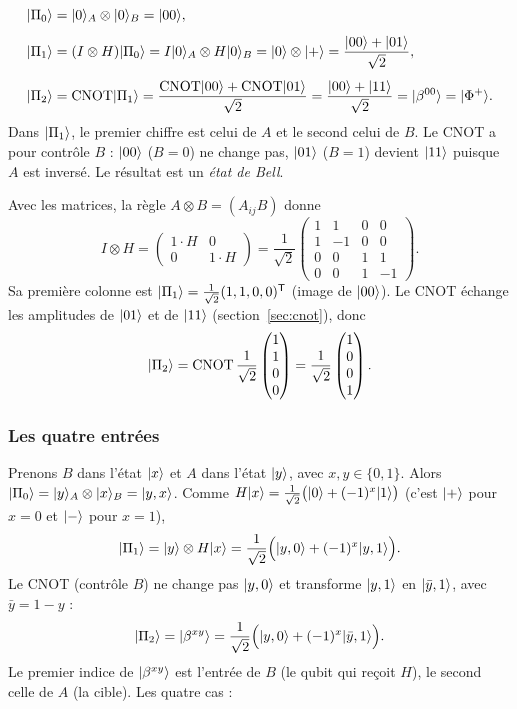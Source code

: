 \begin{align*}
  |\Pi_0\rangle&=|0\rangle_A\otimes|0\rangle_B=|00\rangle,\\[1ex]
  |\Pi_1\rangle&=(I\otimes H)|\Pi_0\rangle=I|0\rangle_A\otimes H|0\rangle_B=|0\rangle\otimes|+\rangle
    =\frac{|00\rangle+|01\rangle}{\sqrt2},\\[1ex]
  |\Pi_2\rangle&=\mathrm{CNOT}|\Pi_1\rangle=\frac{\mathrm{CNOT}|00\rangle+\mathrm{CNOT}|01\rangle}{\sqrt2}
    =\frac{|00\rangle+|11\rangle}{\sqrt2}=|\beta^{00}\rangle=|\Phi^+\rangle.
\end{align*}
Dans $|\Pi_1\rangle$, le premier chiffre est celui de $A$ et le second celui de $B$. Le CNOT a
pour contrôle $B$ : $|00\rangle$ ($B=0$) ne change pas, $|01\rangle$ ($B=1$) devient $|11\rangle$
puisque $A$ est inversé. Le résultat est un \emph{état de Bell}.

Avec les matrices, la règle $A\otimes B=(A_{ij}B)$ donne
\[
  I\otimes H=\begin{pmatrix}1\cdot H&0\\0&1\cdot H\end{pmatrix}
  =\frac{1}{\sqrt2}\begin{pmatrix}1&1&0&0\\1&-1&0&0\\0&0&1&1\\0&0&1&-1\end{pmatrix}.
\]
Sa première colonne est $|\Pi_1\rangle=\frac{1}{\sqrt2}(1,1,0,0)^{\mathsf T}$ (image de $|00\rangle$).
Le CNOT échange les amplitudes de $|01\rangle$ et de $|11\rangle$ (section~\ref{sec:cnot}), donc
\[
  |\Pi_2\rangle=\mathrm{CNOT}\,\frac{1}{\sqrt2}\begin{pmatrix}1\\1\\0\\0\end{pmatrix}
  =\frac{1}{\sqrt2}\begin{pmatrix}1\\0\\0\\1\end{pmatrix}.
\]

\subsubsection{Les quatre entrées}

Prenons $B$ dans l'état $|x\rangle$ et $A$ dans l'état $|y\rangle$, avec $x,y\in\{0,1\}$. Alors
$|\Pi_0\rangle=|y\rangle_A\otimes|x\rangle_B=|y,x\rangle$. Comme
$H|x\rangle=\frac{1}{\sqrt2}\big(|0\rangle+(-1)^x|1\rangle\big)$ (c'est $|+\rangle$ pour $x=0$ et
$|-\rangle$ pour $x=1$),
\[
  |\Pi_1\rangle=|y\rangle\otimes H|x\rangle=\frac{1}{\sqrt2}\Big(|y,0\rangle+(-1)^x|y,1\rangle\Big).
\]
Le CNOT (contrôle $B$) ne change pas $|y,0\rangle$ et transforme $|y,1\rangle$ en
$|\bar y,1\rangle$, avec $\bar y=1-y$ :
\[
  |\Pi_2\rangle=|\beta^{xy}\rangle=\frac{1}{\sqrt2}\Big(|y,0\rangle+(-1)^x|\bar y,1\rangle\Big).
\]
Le premier indice de $|\beta^{xy}\rangle$ est l'entrée de $B$ (le qubit qui reçoit $H$), le
second celle de $A$ (la cible). Les quatre cas :

